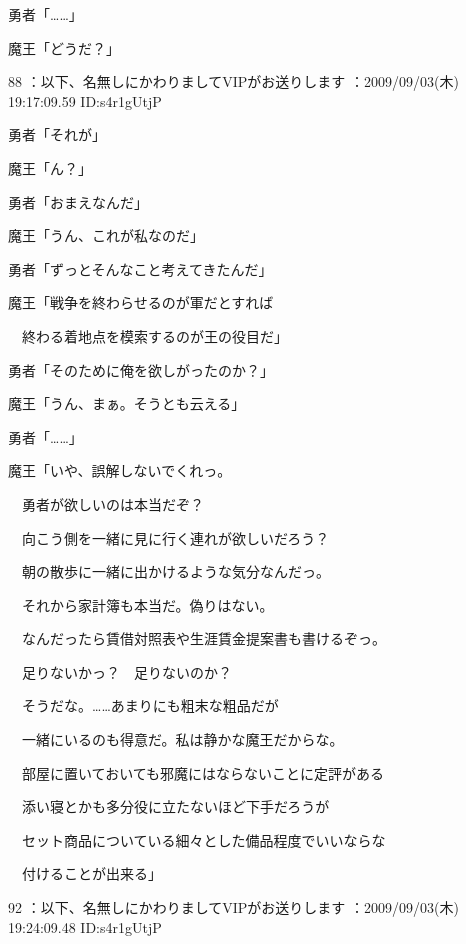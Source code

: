 \documentclass[a4j,twocolumn]{tarticle}
\begin{document}
勇者「……」\par{} 
魔王「どうだ？」
 
	
    
    

88 ：以下、名無しにかわりましてVIPがお送りします ：2009/09/03(木) 19:17:09.59 ID:s4r1gUtjP


勇者「それが」\par{} 
魔王「ん？」 



勇者「おまえなんだ」\par{} 
魔王「うん、これが私なのだ」 



勇者「ずっとそんなこと考えてきたんだ」\par{} 
魔王「戦争を終わらせるのが軍だとすれば\par{} 
　終わる着地点を模索するのが王の役目だ」 



勇者「そのために俺を欲しがったのか？」\par{} 
魔王「うん、まぁ。そうとも云える」\par{} 
勇者「……」 



魔王「いや、誤解しないでくれっ。\par{} 
　勇者が欲しいのは本当だぞ？\par{} 
　向こう側を一緒に見に行く連れが欲しいだろう？\par{} 
　朝の散歩に一緒に出かけるような気分なんだっ。\par{} 
　それから家計簿も本当だ。偽りはない。\par{} 
　なんだったら賃借対照表や生涯賃金提案書も書けるぞっ。\par{} 
　足りないかっ？　足りないのか？\par{} 
　そうだな。……あまりにも粗末な粗品だが\par{} 
　一緒にいるのも得意だ。私は静かな魔王だからな。\par{} 
　部屋に置いておいても邪魔にはならないことに定評がある\par{} 
　添い寝とかも多分役に立たないほど下手だろうが\par{}
　セット商品についている細々とした備品程度でいいならな\par{}
　付けることが出来る」 

	
    
    

92 ：以下、名無しにかわりましてVIPがお送りします ：2009/09/03(木) 19:24:09.48 ID:s4r1gUtjP 
\end{document}
